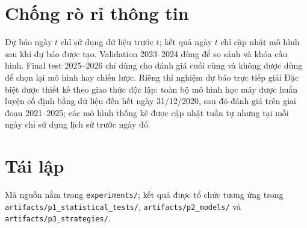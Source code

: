 \section{Chống rò rỉ thông tin}
Dự báo ngày $t$ chỉ sử dụng dữ liệu trước $t$; kết quả ngày $t$ chỉ cập nhật mô hình sau khi dự báo được tạo. Validation 2023--2024 dùng để so sánh và khóa cấu hình. Final test 2025--2026 chỉ dùng cho đánh giá cuối cùng và không được dùng để chọn lại mô hình hay chiến lược. Riêng thí nghiệm dự báo trực tiếp giải Đặc biệt được thiết kế theo giao thức độc lập: toàn bộ mô hình học máy được huấn luyện cố định bằng dữ liệu đến hết ngày 31/12/2020, sau đó đánh giá trên giai đoạn 2021--2025; các mô hình thống kê được cập nhật tuần tự nhưng tại mỗi ngày chỉ sử dụng lịch sử trước ngày đó.

\section{Tái lập}
Mã nguồn nằm trong \texttt{experiments/}; kết quả được tổ chức tương ứng trong \texttt{artifacts/p1\_statistical\_tests/}, \texttt{artifacts/p2\_models/} và \texttt{artifacts/p3\_strategies/}.